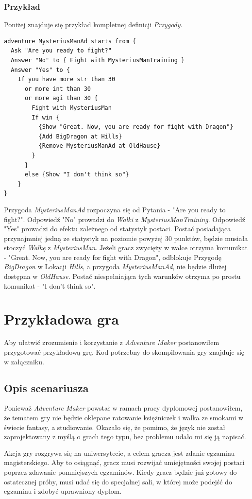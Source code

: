\documentclass[openright]{xmgr}
\begin{document}
\subsection{Przykład}
Poniżej znajduje się przykład kompletnej definicji \textit{Przygody}.
\begin{verbatim}
adventure MysteriusManAd starts from {
  Ask "Are you ready to fight?"
  Answer "No" to { Fight with MysteriusManTraining }
  Answer "Yes" to {
    If you have more str than 30 
      or more int than 30 
      or more agi than 30 {
        Fight with MysteriusMan
        If win {
          {Show "Great. Now, you are ready for fight with Dragon"}
          {Add BigDragon at Hills}
          {Remove MysteriusManAd at OldHause}
        }
      }
      else {Show "I don't think so"}
    }
}
\end{verbatim}
Przygoda \textit{MysteriusManAd} rozpoczyna się od Pytania - "Are you ready to fight?". Odpowiedź "No" prowadzi do \textit{Walki} z \textit{MysteriusManTraining}.
Odpowiedź "Yes" prowadzi do efektu zależnego od statystyk postaci. Postać posiadająca przynajmniej jedną ze statystyk na poziomie powyżej 30 punktów, będzie musiała stoczyć \textit{Walkę} z \textit{MysteriusMan}. Jeżeli gracz zwycięży w walce otrzyma komunikat - "Great. Now, you are ready for fight with Dragon", odblokuje Przygodę \textit{BigDragon} w Lokacji \textit{Hills}, a przygoda \textit{MysteriusManAd}, nie będzie dłużej dostępna w \textit{OldHause}. Postać niespełniająca tych warunków otrzyma po prostu komunikat - "I don't think so". 

\chapter{Przykładowa gra}
Aby ułatwić zrozumienie i korzystanie z \textit{Adventure Maker} postanowiłem przygotować przykładową grę. Kod potrzebny do skompilowania gry znajduje się w załączniku.

\section{Opis scenariusza}

Ponieważ \textit{Adventure Maker} powstał w ramach pracy dyplomowej postanowiłem, że tematem gry nie będzie oklepane ratowanie księżniczek i walka ze smokami w świecie fantasy, a studiowanie. Okazało się, że pomimo, że język nie został zaprojektowany z myślą o grach tego typu, bez problemu udało mi się ją napisać.

Akcja gry rozgrywa się na uniwersytecie, a celem gracza jest zdanie egzaminu magisterskiego. Aby to osiągnąć, gracz musi rozwijać umiejętności swojej postaci poprzez zdawanie pomniejszych egzaminów. Kiedy gracz będzie już gotowy do ostatecznej próby, musi udać się do specjalnej sali, w której może podejść do egzaminu i zdobyć uprawniony dyplom.
\end{document}
